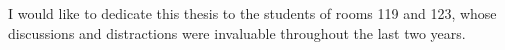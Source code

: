 
\begin{dedication} 

I would like to dedicate this thesis to the students of rooms 119 and 123, whose discussions and distractions were invaluable throughout the last two years.

\end{dedication}
